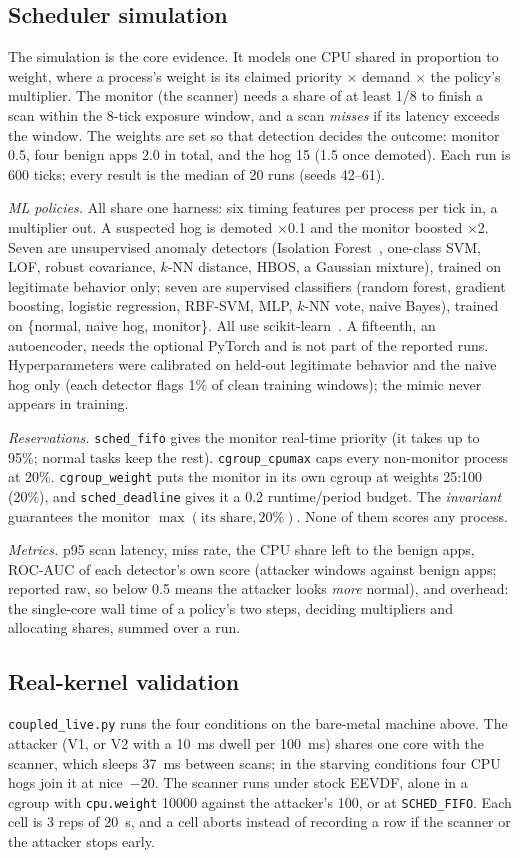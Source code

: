 \documentclass[conference]{IEEEtran}
\begin{document}
\subsection{Scheduler simulation}
The simulation is the core evidence. It models one CPU shared in proportion to
weight, where a process's weight is its claimed priority $\times$ demand
$\times$ the policy's multiplier. The monitor (the scanner) needs a share of at
least 1/8 to finish a scan within the 8-tick exposure window, and a scan
\emph{misses} if its latency exceeds the window. The weights are set so that
detection decides the outcome: monitor 0.5, four benign apps 2.0 in total, and
the hog 15 (1.5 once demoted). Each run is 600 ticks; every result is the median
of 20 runs (seeds 42--61).

\emph{ML policies.} All share one harness: six timing features per process per
tick in, a multiplier out. A suspected hog is demoted $\times$0.1 and the
monitor boosted $\times$2. Seven are unsupervised anomaly detectors (Isolation
Forest~\cite{iforest}, one-class SVM, LOF, robust covariance, $k$-NN distance,
HBOS, a Gaussian mixture), trained on legitimate behavior only; seven are
supervised classifiers (random forest, gradient boosting, logistic regression,
RBF-SVM, MLP, $k$-NN vote, naive Bayes), trained on \{normal, naive hog,
monitor\}. All use scikit-learn~\cite{sklearn}. A fifteenth, an autoencoder,
needs the optional PyTorch and is not part of the reported runs. Hyperparameters
were calibrated on held-out legitimate behavior and the naive hog only (each
detector flags 1\% of clean training windows); the mimic never appears in
training.

\emph{Reservations.} \texttt{sched\_fifo} gives the monitor real-time priority
(it takes up to 95\%; normal tasks keep the rest). \texttt{cgroup\_cpumax} caps
every non-monitor process at 20\%. \texttt{cgroup\_weight} puts the monitor in
its own cgroup at weights 25:100 (20\%), and \texttt{sched\_deadline} gives it a
0.2 runtime/period budget. The \emph{invariant} guarantees the monitor
$\max(\text{its share}, 20\%)$. None of them scores any process.

\emph{Metrics.} p95 scan latency, miss rate, the CPU share left to the benign
apps, ROC-AUC of each detector's own score (attacker windows against benign
apps; reported raw, so below 0.5 means the attacker looks \emph{more} normal),
and overhead: the single-core wall time of a policy's two steps, deciding
multipliers and allocating shares, summed over a run.

\subsection{Real-kernel validation}
\texttt{coupled\_live.py} runs the four conditions on the bare-metal machine
above. The attacker (V1, or V2 with a 10~ms dwell per 100~ms) shares one core
with the scanner, which sleeps 37~ms between scans; in the starving conditions
four CPU hogs join it at nice~$-20$. The scanner runs under stock EEVDF, alone
in a cgroup with \texttt{cpu.weight} 10000 against the attacker's 100, or at
\texttt{SCHED\_FIFO}. Each cell is 3 reps of 20~s, and a cell aborts instead of
recording a row if the scanner or the attacker stops early.
\end{document}
